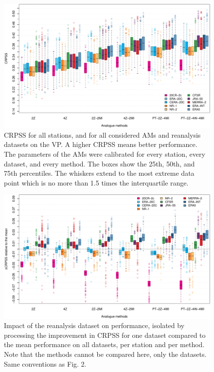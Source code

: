 \documentclass[alpha-refs]{wiley-article}
\begin{document}
\begin{figure}[bt]
    \centering
    \includegraphics[width=\textwidth]{figures/boxplot-per-method.pdf}
    \caption{CRPSS for all stations, and for all considered AMs and reanalysis datasets on the VP. A higher CRPSS means better performance. The parameters of the AMs were calibrated for every station, every dataset, and every method. The boxes show the 25th, 50th, and 75th percentiles. The whiskers extend to the most extreme data point which is no more than 1.5 times the interquartile range.}
    \label{fig:comparison_values}
\end{figure}

\begin{figure}[bt]
    \centering
    \includegraphics[width=\textwidth]{figures/boxplot-per-method-diff.pdf}
    \caption{Impact of the reanalysis dataset on performance, isolated by processing the improvement in CRPSS for one dataset compared to the mean performance on all datasets, per station and per method. Note that the methods cannot be compared here, only the datasets. Same conventions as Fig. 2.}
    \label{fig:comparison_relative}
\end{figure}
\end{document}
